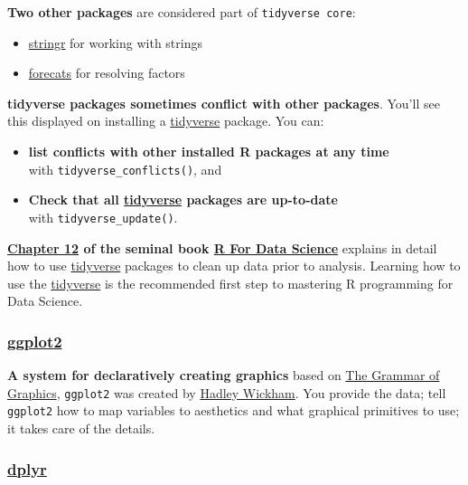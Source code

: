 \documentclass[]{book}
\providecommand{\tightlist}{%
  \setlength{\itemsep}{0pt}\setlength{\parskip}{0pt}}
\theoremstyle{definition}
\theoremstyle{definition}
\theoremstyle{definition}
\theoremstyle{remark}
\begin{document}
\textbf{Two other packages} are considered part of
\texttt{tidyverse\ core}:

\begin{itemize}
\tightlist
\item
  \href{http://stringr.tidyverse.org/}{stringr} for working with strings
\item
  \href{http://forcats.tidyverse.org/}{forecats} for resolving factors
\end{itemize}

\textbf{tidyverse packages sometimes conflict with other packages}.
You'll see this displayed on installing a
\href{https://www.tidyverse.org/}{tidyverse} package. You can:

\begin{itemize}
\item
  \textbf{list conflicts with other installed R packages at any time}\\
  with \texttt{tidyverse\_conflicts()}, and
\item
  \textbf{Check that all \href{https://www.tidyverse.org/}{tidyverse}
  packages are up-to-date}\\
  with \texttt{tidyverse\_update()}.
\end{itemize}

\textbf{\href{http://r4ds.had.co.nz/tidy-data.html}{Chapter 12} of the
seminal book \href{http://r4ds.had.co.nz/}{R For Data Science}} explains
in detail how to use \href{https://www.tidyverse.org/}{tidyverse}
packages to clean up data prior to analysis. Learning how to use the
\href{http://tidyverse.org/}{tidyverse} is the recommended first step to
mastering R programming for Data Science.

\hypertarget{ggplot2}{%
\subsubsection{\texorpdfstring{
\href{http://ggplot2.tidyverse.org/}{ggplot2}}{ ggplot2}}\label{ggplot2}}

\textbf{A system for declaratively creating graphics} based on
\href{vita.had.co.nz/papers/layered-grammar.pdf}{The Grammar of
Graphics}, \texttt{ggplot2} was created by
\href{http://hadley.nz/}{Hadley Wickham}. You provide the data; tell
\texttt{ggplot2} how to map variables to aesthetics and what graphical
primitives to use; it takes care of the details.

\hypertarget{dplyr}{%
\subsubsection{\texorpdfstring{
\href{http://dplyr.tidyverse.org/}{dplyr}}{ dplyr}}\label{dplyr}}
\end{document}
